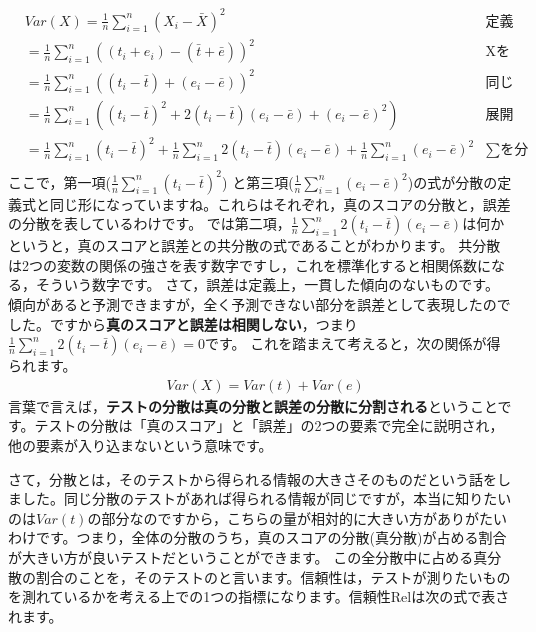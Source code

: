 \documentclass{ltjbook}
\begin{document}
\begin{align*}
    &           Var(X)  =  \frac{1}{n}\sum_{i=1}^n (X_i - \bar{X})^2 & \mbox{定義より} \\
    &                       = \frac{1}{n}\sum_{i=1}^n  ((t_i + e_i) - (\bar{t} + \bar{e}))^2 & \mbox{Xをテスト理論のモデルに} \\
    &                       = \frac{1}{n}\sum_{i=1}^n (  (t_i - \bar{t}) + (e_i - \bar{e}) )^2 & \mbox{同じ記号でまとめる} \\
    &                       = \frac{1}{n}\sum_{i=1}^n (  (t_i - \bar{t})^2 + 2(t_i - \bar{t})(e_i - \bar{e}) + (e_i - \bar{e})^2  ) & \mbox{展開する}\\
    &                       = \frac{1}{n}\sum_{i=1}^n (t_i - \bar{t})^2 +\frac{1}{n}\sum_{i=1}^n 2(t_i - \bar{t})(e_i - \bar{e})  + \frac{1}{n}\sum_{i=1}^n (e_i - \bar{e})^2 & \mbox{$\sum$を分配} \\
\end{align*}
ここで，第一項($\frac{1}{n}\sum_{i=1}^n (t_i - \bar{t})^2$) と第三項($\frac{1}{n}\sum_{i=1}^n (e_i - \bar{e})^2$)の式が分散の定義式と同じ形になっていますね。これらはそれぞれ，真のスコアの分散と，誤差の分散を表しているわけです。
では第二項，$\frac{1}{n}\sum_{i=1}^n 2(t_i - \bar{t})(e_i - \bar{e})$は何かというと，真のスコアと誤差との共分散の式であることがわかります。 共分散は2つの変数の関係の強さを表す数字ですし，これを標準化すると相関係数になる，そういう数字です。
さて，誤差は定義上，一貫した傾向のないものです。傾向があると予測できますが，全く予測できない部分を誤差として表現したのでした。ですから\textbf{真のスコアと誤差は相関しない}，つまり$\frac{1}{n}\sum_{i=1}^n 2(t_i - \bar{t})(e_i - \bar{e})=0$です。
これを踏まえて考えると，次の関係が得られます。
\begin{align*}
    & Var(X)= Var(t) + Var(e)
\end{align*}
言葉で言えば，\textbf{テストの分散は真の分散と誤差の分散に分割される}ということです。テストの分散は「真のスコア」と「誤差」の2つの要素で完全に説明され，他の要素が入り込まないという意味です。

さて，分散とは，そのテストから得られる情報の大きさそのものだという話をしました。同じ分散のテストがあれば得られる情報が同じですが，本当に知りたいのは$Var(t)$の部分なのですから，こちらの量が相対的に大きい方がありがたいわけです。つまり，全体の分散のうち，真のスコアの分散(真分散)が占める割合が大きい方が良いテストだということができます。
この全分散中に占める真分散の割合のことを，そのテストのと言います。信頼性は，テストが測りたいものを測れているかを考える上での1つの指標になります。信頼性Relは次の式で表されます。
\end{document}
